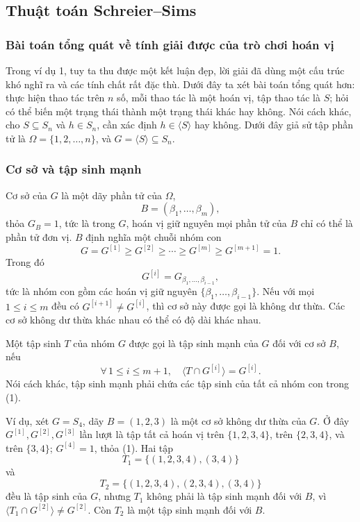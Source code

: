 \documentclass[11pt]{article}
\begin{document}
\subsection{Thuật toán Schreier--Sims}

\subsubsection{Bài toán tổng quát về tính giải được của trò chơi hoán vị}

Trong ví dụ 1, tuy ta thu được một kết luận đẹp, lời giải đã dùng một cấu trúc
khó nghĩ ra và các tính chất rất đặc thù. Dưới đây ta xét bài toán tổng quát
hơn: thực hiện thao tác trên \(n\) số, mỗi thao tác là một hoán vị, tập thao tác
là \(S\); hỏi có thể biến một trạng thái thành một trạng thái khác hay không.
Nói cách khác, cho \(S\subseteq S_n\) và \(h\in S_n\), cần xác định
\(h\in\langle S\rangle\) hay không. Dưới đây giả sử tập phần tử là
\(\Omega=\{1,2,\ldots,n\}\), và \(G=\langle S\rangle\subseteq S_n\).

\subsubsection{Cơ sở và tập sinh mạnh}

Cơ sở của \(G\) là một dãy phần tử của \(\Omega\),
\[
  B=(\beta_1,\ldots,\beta_m),
\]
thỏa \(G_B=1\), tức là trong \(G\), hoán vị giữ nguyên mọi phần tử của \(B\) chỉ
có thể là phần tử đơn vị. \(B\) định nghĩa một chuỗi nhóm con
\[
  G=G^{[1]}\ge G^{[2]}\ge\cdots\ge G^{[m]}\ge G^{[m+1]}=1. \tag{1}
\]
Trong đó
\[
  G^{[i]}=G_{\beta_1,\ldots,\beta_{i-1}},
\]
tức là nhóm con gồm các hoán vị giữ nguyên \(\{\beta_1,\ldots,\beta_{i-1}\}\).
Nếu với mọi \(1\le i\le m\) đều có \(G^{[i+1]}\ne G^{[i]}\), thì cơ sở này được
gọi là không dư thừa. Các cơ sở không dư thừa khác nhau có thể có độ dài khác
nhau.

Một tập sinh \(T\) của nhóm \(G\) được gọi là tập sinh mạnh của \(G\) đối với cơ
sở \(B\), nếu
\[
  \forall\,1\le i\le m+1,\quad
  \langle T\cap G^{[i]}\rangle=G^{[i]}. \tag{2}
\]
Nói cách khác, tập sinh mạnh phải chứa các tập sinh của tất cả nhóm con trong
(1).

Ví dụ, xét \(G=S_4\), dãy \(B=(1,2,3)\) là một cơ sở không dư thừa của \(G\).
Ở đây \(G^{[1]},G^{[2]},G^{[3]}\) lần lượt là tập tất cả hoán vị trên
\(\{1,2,3,4\}\), trên \(\{2,3,4\}\), và trên \(\{3,4\}\); \(G^{[4]}=1\), thỏa
(1). Hai tập
\[
T_1=\{(1,2,3,4),(3,4)\}
\]
và
\[
T_2=\{(1,2,3,4),(2,3,4),(3,4)\}
\]
đều là tập sinh của \(G\), nhưng \(T_1\) không phải là tập sinh mạnh đối với
\(B\), vì \(\langle T_1\cap G^{[2]}\rangle\ne G^{[2]}\). Còn \(T_2\) là một
tập sinh mạnh đối với \(B\).
\end{document}
